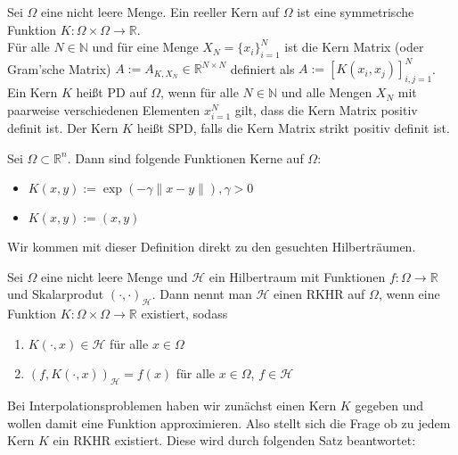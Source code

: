 \begin{definition}
Sei $\Omega$ eine nicht leere Menge. Ein reeller Kern auf $\Omega$ ist eine symmetrische Funktion $K: \Omega \times \Omega \rightarrow \mathbb{R}$.\\
Für alle $N \in \mathbb{N}$ und für eine Menge $X_N = \{x_i\}_{i=1}^N$ ist die Kern Matrix (oder Gram'sche Matrix) $A:= A_{K,X_N} \in \mathbb{R}^{N \times N}$  definiert als $A:=[K(x_i, x_j)]_{i,j=1}^N$.\\
Ein Kern $K$ heißt \ac{PD} auf $\Omega$, wenn für alle $N \in \mathbb{N}$ und alle Mengen $X_N$ mit paarweise verschiedenen Elementen $x_{i=1}^N$ gilt, dass die Kern Matrix positiv definit ist. Der Kern $K$ heißt \ac{SPD}, falls die Kern Matrix strikt positiv definit ist.
\end{definition}

\begin{example} Sei $\Omega \subset \mathbb{R}^n$. Dann sind folgende Funktionen Kerne auf $\Omega$:\\
\begin{itemize}
\item $K(x,y) := \exp(-\gamma \|x-y\|),\gamma > 0$
\item $K(x,y) := (x,y)$
\end{itemize}
\end{example}

Wir kommen mit dieser Definition direkt zu den gesuchten Hilberträumen.

\begin{definition}
Sei $\Omega$ eine nicht leere Menge und $\mathcal{H}$ ein Hilbertraum mit Funktionen $f:\Omega \rightarrow \mathbb{R}$ und Skalarprodut $(\cdot, \cdot)_\mathcal{H}$. Dann nennt man $\mathcal{H}$ einen \ac{RKHR} auf $\Omega$, wenn eine Funktion $K:\Omega \times \Omega \rightarrow \mathbb{R}$ existiert, sodass
\begin{enumerate}
\item $K(\cdot, x) \in \mathcal{H}$ für alle $x \in \Omega$
\item $(f, K(\cdot,x))_\mathcal{H} = f(x)$ für alle $ x \in \Omega$, $f \in \mathcal{H}$
\end{enumerate}
\end{definition}

Bei Interpolationsproblemen haben wir zunächst einen Kern $K$ gegeben und wollen damit eine Funktion approximieren. Also stellt sich die Frage ob zu jedem Kern $K$ ein \ac{RKHR} existiert. Diese wird durch folgenden Satz beantwortet:

